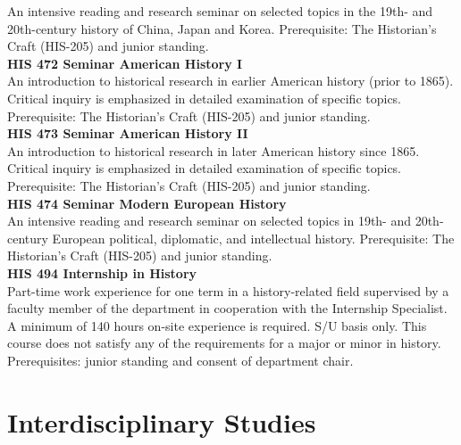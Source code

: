 \documentclass[
  letterpaper,
]{scrbook}
\begin{document}
An intensive reading and research seminar on selected topics in the
19th- and 20th-century history of China, Japan and Korea. Prerequisite:
The Historian's Craft (HIS-205) and junior standing.\\
\textbf{HIS 472 Seminar American History I}\\
An introduction to historical research in earlier American history
(prior to 1865). Critical inquiry is emphasized in detailed examination
of specific topics. Prerequisite: The Historian's Craft (HIS-205) and
junior standing.\\
\textbf{HIS 473 Seminar American History II}\\
An introduction to historical research in later American history since
1865. Critical inquiry is emphasized in detailed examination of specific
topics. Prerequisite: The Historian's Craft (HIS-205) and junior
standing.\\
\textbf{HIS 474 Seminar Modern European History}\\
An intensive reading and research seminar on selected topics in 19th-
and 20th-century European political, diplomatic, and intellectual
history. Prerequisite: The Historian's Craft (HIS-205) and junior
standing.\\
\textbf{HIS 494 Internship in History}\\
Part-time work experience for one term in a history-related field
supervised by a faculty member of the department in cooperation with the
Internship Specialist. A minimum of 140 hours on-site experience is
required. S/U basis only. This course does not satisfy any of the
requirements for a major or minor in history. Prerequisites: junior
standing and consent of department chair.

\section{Interdisciplinary Studies}\label{sec-interdisciplinary-studies}
\end{document}
